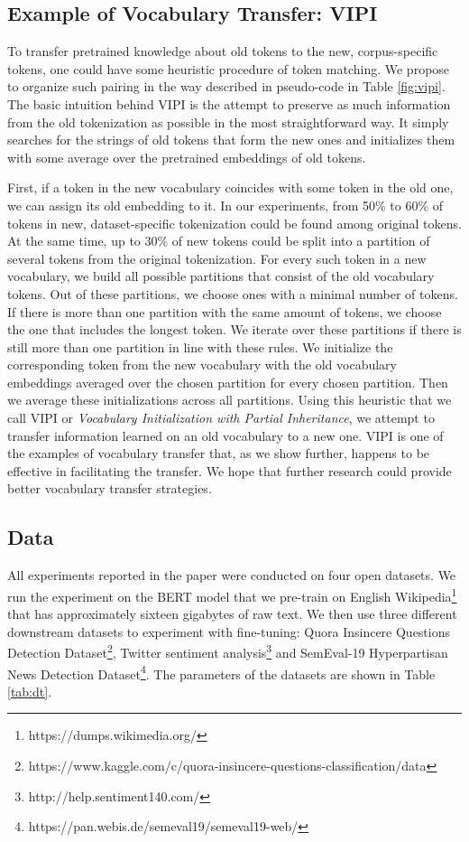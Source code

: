 \documentclass[review]{elsarticle}
\begin{document}
\subsection{Example of Vocabulary Transfer: VIPI}

To transfer pretrained knowledge about old tokens to the new, corpus-specific tokens, one could have some heuristic procedure of token matching. We propose to organize such pairing in the way described in pseudo-code in Table \ref{fig:vipi}. The basic intuition behind VIPI is the attempt to preserve as much information from the old tokenization as possible in the most straightforward way. It simply searches for the strings of old tokens that form the new ones and initializes them with some average over the pretrained embeddings of old tokens.

First, if a token in the new vocabulary coincides with some token in the old one, we can assign its old embedding to it. In our experiments, from 50\% to 60\% of tokens in new, dataset-specific tokenization could be found among original tokens. At the same time, up to 30\% of new tokens could be split into a partition of several tokens from the original tokenization. For every such token in a new vocabulary, we build all possible partitions that consist of the old vocabulary tokens. Out of these partitions, we choose ones with a minimal number of tokens. If there is more than one partition with the same amount of tokens, we choose the one that includes the longest token. We iterate over these partitions if there is still more than one partition in line with these rules. We initialize the corresponding token from the new vocabulary with the old vocabulary embeddings averaged over the chosen partition for every chosen partition. Then we average these initializations across all partitions. Using this heuristic that we call VIPI or {\em Vocabulary Initialization with Partial Inheritance}, we attempt to transfer information learned on an old vocabulary to a new one. VIPI is one of the examples of vocabulary transfer that, as we show further, happens to be effective in facilitating the transfer. We hope that further research could provide better vocabulary transfer strategies.

\subsection{Data}

All experiments reported in the paper were conducted on four open datasets. We run the experiment on the BERT model that we pre-train on English Wikipedia\footnote{https://dumps.wikimedia.org/}  that has approximately sixteen gigabytes of raw text. We then use three different downstream datasets to experiment with fine-tuning: Quora Insincere Questions Detection Dataset\footnote{https://www.kaggle.com/c/quora-insincere-questions-classification/data}, Twitter sentiment analysis\footnote{http://help.sentiment140.com/} and SemEval-19 Hyperpartisan News Detection Dataset\footnote{https://pan.webis.de/semeval19/semeval19-web/}. The parameters of the datasets are shown in Table \ref{tab:dt}.
\end{document}
